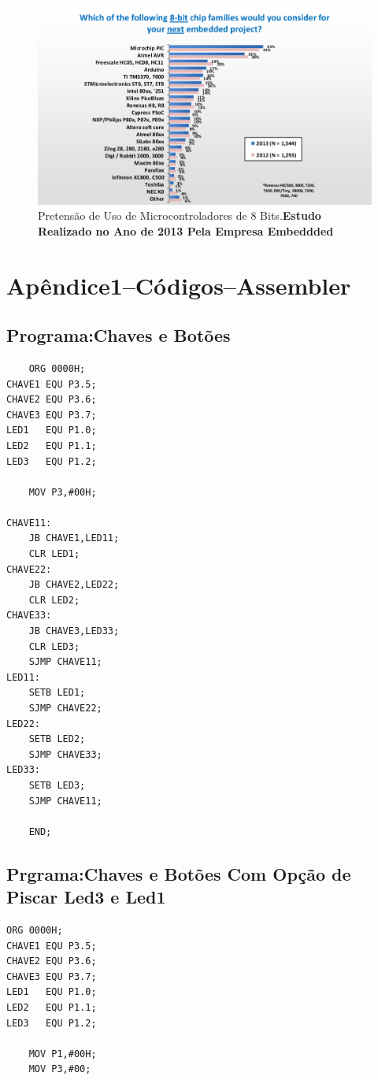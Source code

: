 \documentclass{Fabiano_file}
\begin{document}
{\begin{figure}[h!]
\centering
\includegraphics[width=.7\textwidth]{8_bits_pretencao_de_uso_microcontroladores.pdf}
\caption{Pretensão de Uso de Microcontroladores de 8 Bits.\textbf{Estudo Realizado no Ano de 2013 Pela Empresa Embeddded}}
\label{fig:8_bits_pretencao_de_uso_microcontroladores}
\end{figure}


\newpage

\section{Apêndice1--Códigos--Assembler}
\subsection{Programa:Chaves e Botões}
\begin{lstlisting}
	ORG 0000H;
CHAVE1 EQU P3.5;
CHAVE2 EQU P3.6;
CHAVE3 EQU P3.7;
LED1   EQU P1.0;
LED2   EQU P1.1;
LED3   EQU P1.2;

	MOV P3,#00H;

CHAVE11:
	JB CHAVE1,LED11;
	CLR LED1;
CHAVE22:
	JB CHAVE2,LED22;
	CLR LED2;
CHAVE33:		
	JB CHAVE3,LED33;
	CLR LED3;
	SJMP CHAVE11;
LED11:	
	SETB LED1;
	SJMP CHAVE22;
LED22: 		
	SETB LED2;
	SJMP CHAVE33;
LED33:
	SETB LED3;
	SJMP CHAVE11;

	END;
\end{lstlisting}

\newpage

\subsection{Prgrama:Chaves e Botões Com Opção de Piscar Led3 e Led1}
\begin{lstlisting}
ORG 0000H;
CHAVE1 EQU P3.5;
CHAVE2 EQU P3.6;
CHAVE3 EQU P3.7;
LED1   EQU P1.0;
LED2   EQU P1.1;
LED3   EQU P1.2;

	MOV P1,#00H;
	MOV P3,#00;


\end{lstlisting}}
\end{document}
